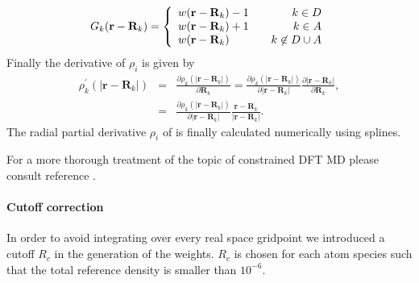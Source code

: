 \documentclass[twoside,10pt,titlepage,a4paper]{article}
\begin{document}
\begin{eqnarray}
G_k(\mathbf{r}-\mathbf{R}_k) = \left\lbrace
\begin{array}{l c r}
w(\mathbf{r}-\mathbf{R}_k)-1 & & k \in D\\
w(\mathbf{r}-\mathbf{R}_k)+1 & & k \in A\\
w(\mathbf{r}-\mathbf{R}_k) & & k \not\in D\cup A\\
\end{array}\right.
\end{eqnarray}
Finally the derivative of $\rho_i$ is given by
\begin{eqnarray}
\rho_k^\prime(\vert\mathbf{r}-\mathbf{R}_k\vert)&=&\frac{\partial\rho_k(\vert\mathbf{r}-\mathbf{R}_k\vert)}{\partial\mathbf{R}_k}= \frac{\partial\rho_k(\vert\mathbf{r}-\mathbf{R}_k\vert)}{\partial \vert\mathbf{r}-\mathbf{R}_k\vert}\frac{\partial\vert\mathbf{r}-\mathbf{R}_k\vert}{\partial\mathbf{R}_k},\nonumber\\
&=& \frac{\partial\rho_k(\vert\mathbf{r}-\mathbf{R}_k\vert)}{\partial \vert\mathbf{r}-\mathbf{R}_k\vert}\frac{\mathbf{r}-\mathbf{R}_k}{\vert\mathbf{r}-\mathbf{R}_k\vert}.
\end{eqnarray}
The radial partial derivative $\rho_i$ of is finally calculated numerically using splines.

For a more thorough treatment of the topic of constrained DFT MD please consult reference \cite{Oberhofer09}.

\paragraph{Cutoff correction}
In order to avoid integrating over every real space gridpoint we introduced a cutoff $R_c$ in the generation of the weights. $R_c$ is chosen for each atom species such that the total reference density is smaller than $10^{-6}$. 
\end{document}
